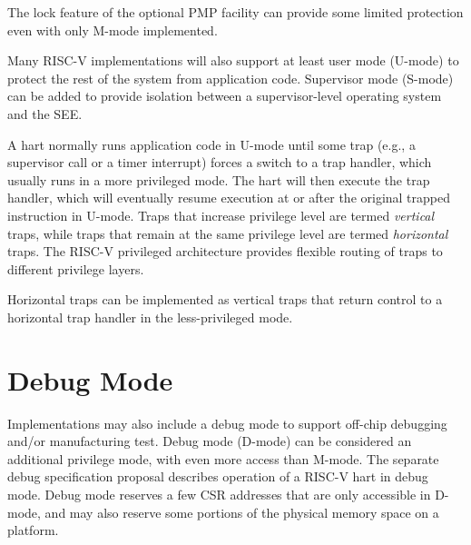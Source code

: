\begin{commentary}
  The lock feature of the optional PMP facility can provide some
  limited protection even with only M-mode implemented.
\end{commentary}

Many RISC-V implementations will also support at least user mode
(U-mode) to protect the rest of the system from application code.
Supervisor mode (S-mode) can be added to provide isolation between a
supervisor-level operating system and the SEE.

A hart normally runs application code in U-mode until some trap (e.g.,
a supervisor call or a timer interrupt) forces a switch to a trap
handler, which usually runs in a more privileged mode. The hart will
then execute the trap handler, which will eventually resume execution
at or after the original trapped instruction in U-mode.  Traps that
increase privilege level are termed {\em vertical} traps, while traps
that remain at the same privilege level are termed {\em horizontal}
traps.  The RISC-V privileged architecture provides flexible routing
of traps to different privilege layers.

\begin{commentary}
Horizontal traps can be implemented as vertical traps that
return control to a horizontal trap handler in the less-privileged mode.
\end{commentary}

\section{Debug Mode}

Implementations may also include a debug mode to support off-chip
debugging and/or manufacturing test.  Debug mode (D-mode) can be
considered an additional privilege mode, with even more access than
M-mode. The separate debug specification proposal describes operation
of a RISC-V hart in debug mode.  Debug mode reserves a few CSR
addresses that are only accessible in D-mode, and may also reserve
some portions of the physical memory space on a platform.
